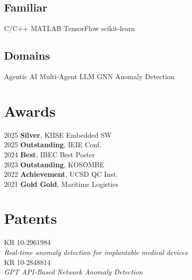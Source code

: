 \documentclass[]{deedy-resume-openfont}
\begin{document}
\begin{minipage}[t]{0.33\textwidth}
\subsection{Familiar}
C/C++ \textbullet{} MATLAB \textbullet{} TensorFlow \textbullet{} scikit-learn
\sectionsep

\subsection{Domains}
Agentic AI \textbullet{} Multi-Agent LLM \textbullet{} GNN \textbullet{} Anomaly Detection
\sectionsep

\section{Awards}
2025 \textbar{} \textbf{Silver}, KIISE Embedded SW \\
2025 \textbar{} \textbf{Outstanding}, IEIE Conf. \\
2024 \textbar{} \textbf{Best}, IBEC Best Poster \\
2023 \textbar{} \textbf{Outstanding}, KOSOMBE \\
2022 \textbar{} \textbf{Achievement}, UCSD QC Inst. \\
2021 \textbar{} \textbf{Gold Gold}, Maritime Logistics

\sectionsep

\section{Patents}
KR 10-2961984 \\
\textit{Real-time anomaly detection for implantable medical devices} \\[0.3em]
KR 10-2848814 \\
\textit{GPT API-Based Network Anomaly Detection}
\end{minipage}
\hfill
\end{document}
